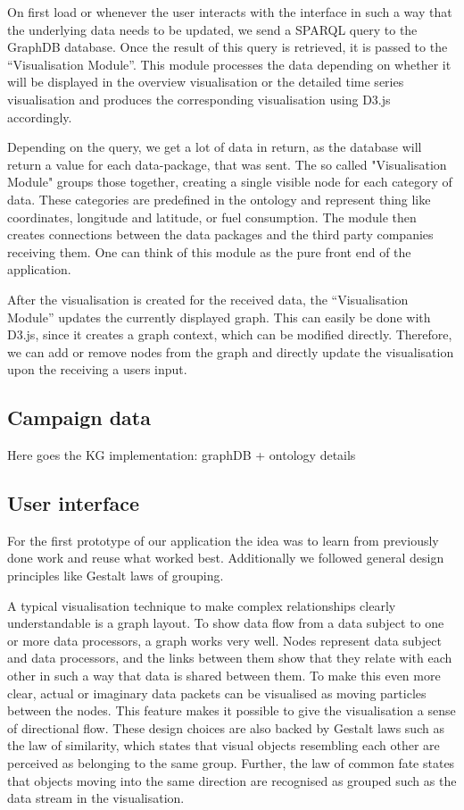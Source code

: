 \documentclass[../paper.tex]{subfiles}
\begin{document}
  On first load or whenever the user interacts with the interface in such a way
  that the underlying data needs to be updated, we send a SPARQL query to the
  GraphDB database. Once the result of this query is retrieved, it is passed to
  the “Visualisation Module”. This module processes the data depending on
  whether it will be displayed in the overview visualisation or the detailed
  time series visualisation and produces the corresponding visualisation
  using D3.js accordingly.

  Depending on the query, we get a lot of data in return, as the database
  will return a value for each data-package, that was sent. The so called
  "Visualisation Module" groups those together, creating a single visible
  node for each category of data. These categories are predefined in the
  ontology and represent thing like coordinates, longitude and latitude, or
  fuel consumption. The module then creates connections between the data packages
  and the third party companies receiving them. One can think of this module
  as the pure front end of the application.

  After the visualisation is created for the received data, the “Visualisation Module”
  updates the currently displayed graph. This can easily be done with D3.js, since
  it creates a graph context, which can be modified directly. Therefore,
  we can add or remove nodes from the graph and directly update the visualisation
  upon the receiving a users input.
  
  \subsection{Campaign data}
  Here goes the KG implementation: graphDB + ontology details
  
  \subsection{User interface}
  For the first prototype of our application the idea was to learn from
  previously done work and reuse what worked best. Additionally we followed
  general design principles like Gestalt laws \cite{wiki:principles_of_grouping}
  of grouping.

  A typical visualisation technique to make complex relationships clearly
  understandable is a graph layout. To show data flow from a data subject to one
  or more data processors, a graph works very well. Nodes represent data
  subject and data processors, and the links between them show that they relate
  with each other in such a way that data is shared between them. To make this
  even more clear, actual or imaginary data packets can be visualised as moving
  particles between the nodes. This feature makes it possible to give the
  visualisation a sense of directional flow.
  These design choices are also backed by Gestalt laws such as the law of
  similarity, which states that visual objects resembling each other are
  perceived as belonging to the same group. Further, the law of common fate
  states that objects moving into the same direction are recognised as grouped
  such as the data stream in the visualisation.
\end{document}
